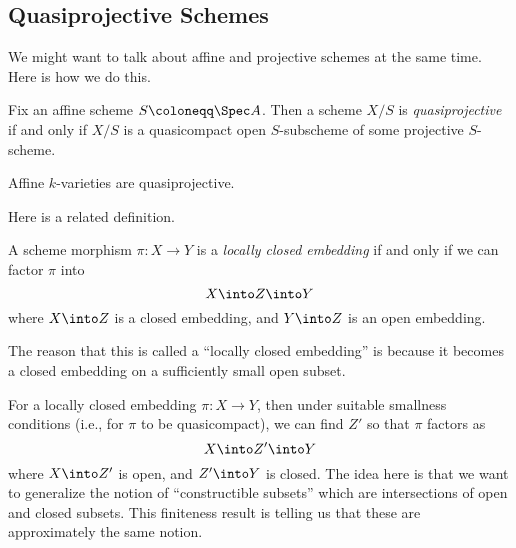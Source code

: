 \documentclass[../notes.tex]{subfiles}
\begin{document}
\subsection{Quasiprojective Schemes}
We might want to talk about affine and projective schemes at the same time. Here is how we do this.
\begin{definition}[Quasiprojective]
	Fix an affine scheme $S\coloneqq\Spec A$. Then a scheme $X/S$ is \textit{quasiprojective} if and only if $X/S$ is a quasicompact open $S$-subscheme of some projective $S$-scheme.
\end{definition}
\begin{example}
	Affine $k$-varieties are quasiprojective.
\end{example}
Here is a related definition.
\begin{definition}
	A scheme morphism $\pi\colon X\to Y$ is a \textit{locally closed embedding} if and only if we can factor $\pi$ into
	\[X\into Z\into Y\]
	where $X\into Z$ is a closed embedding, and $Y\into Z$ is an open embedding.
\end{definition}
The reason that this is called a ``locally closed embedding'' is because it becomes a closed embedding on a sufficiently small open subset.
\begin{remark}
	For a locally closed embedding $\pi\colon X\to Y$, then under suitable smallness conditions (i.e., for $\pi$ to be quasicompact), we can find $Z'$ so that $\pi$ factors as
	\[X\into Z'\into Y\]
	where $X\into Z'$ is open, and $Z'\into Y$ is closed. The idea here is that we want to generalize the notion of ``constructible subsets'' which are intersections of open and closed subsets. This finiteness result is telling us that these are approximately the same notion.
\end{remark}
\end{document}
